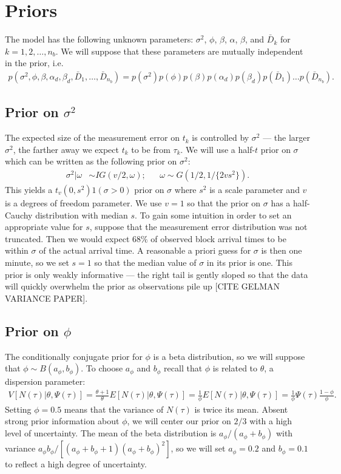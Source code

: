 \documentclass{article}
\begin{document}
\section{Priors}
The model has the following unknown parameters: $\sigma^2$, $\phi$, $\beta$, $\alpha$, $\beta$, and $\bar{D}_k$ for $k=1,2,\dots,n_b$. We will suppose that these parameters are mutually independent in the prior, i.e.
\begin{align*}
p(\sigma^2,\phi,\beta,\alpha_d,\beta_d,\bar{D}_1,\dots,\bar{D}_{n_{b}}) = p(\sigma^2)p(\phi)p(\beta)p(\alpha_d)p(\beta_d)p(\bar{D}_1)\hdots p(\bar{D}_{n_{b}}).
\end{align*}

\subsection{Prior on $\sigma^2$}
The expected size of the measurement error on $t_k$ is controlled by $\sigma^2$ --- the larger $\sigma^2$, the farther away we expect $t_k$ to be from $\tau_k$. We will use a half-$t$ prior on $\sigma$ which can be written as the following prior on $\sigma^2$:
\begin{align*}
\sigma^2|\omega &\sim IG(v/2, \omega); && \omega \sim G(1/2, 1/\{2vs^2\}).
\end{align*}
This yields a $t_{v}(0,s^2)1(\sigma>0)$ prior on $\sigma$ where $s^2$ is a scale parameter and $v$ is a degrees of freedom parameter. We use $v=1$ so that the prior on $\sigma$ has a half-Cauchy distribution with median $s$. To gain some intuition in order to set an appropriate value for $s$, suppose that the measurement error distribution was not truncated. Then we would expect $68\%$ of observed block arrival times to be within $\sigma$ of the actual arrival time. A reasonable a priori guess for $\sigma$ is then one minute, so we set $s=1$ so that the median value of $\sigma$ in its prior is one. This prior is only weakly informative --- the right tail is gently sloped so that the data will quickly overwhelm the prior as observations pile up [CITE GELMAN VARIANCE PAPER]. 

\subsection{Prior on $\phi$}
The conditionally conjugate prior for $\phi$ is a beta distribution, so we will suppose that $\phi \sim B(a_{\phi}, b_{\phi})$. To choose $a_\phi$ and $b_\phi$ recall that $\phi$ is related to $\theta$, a dispersion parameter:
\begin{align*}
V[N(\tau)|\theta,\Psi(\tau)] = \frac{\theta + 1}{\theta}E[N(\tau)|\theta,\Psi(\tau)] = \frac{1}{\phi}E[N(\tau)|\theta,\Psi(\tau)] = \frac{1}{\phi}\Psi(\tau)\frac{1-\phi}{\phi}.
\end{align*}
Setting $\phi = 0.5$ means that the variance of $N(\tau)$ is twice its mean. Absent strong prior information about $\phi$, we will center our prior on $2/3$ with a high level of uncertainty. The mean of the beta distribution is $a_\phi/(a_\phi + b_\phi)$ with variance $a_\phi b_\phi/[(a_\phi + b_\phi + 1)(a_\phi + b_\phi)^2]$, so we will set $a_\phi = 0.2$ and $b_\phi = 0.1$ to reflect a high degree of uncertainty.
\end{document}
